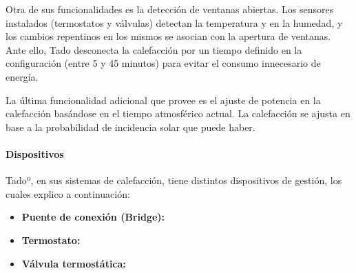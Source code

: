 \documentclass[spanish,12pt, a4paper, twoside]{paper}
\begin{document}
Otra de sus funcionalidades es la detección de ventanas abiertas. Los sensores instalados (termostatos y válvulas) detectan la temperatura y en la humedad, y los cambios repentinos en los mismos se asocian con la apertura de ventanas. Ante ello, Tado desconecta la calefacción por un tiempo definido en la configuración (entre 5 y 45 minutos) para evitar el consumo innecesario de energía.
\newline

La última funcionalidad adicional que provee es el ajuste de potencia en la calefacción basándose en el tiempo atmosférico actual. La calefacción se ajusta en base a la probabilidad de incidencia solar que puede haber.

\paragraph{Dispositivos}

Tadoº, en sus sistemas de calefacción, tiene distintos dispositivos de gestión, los cuales explico a continuación:

\begin{itemize}
\item\textbf{Puente de conexión (Bridge):}
\item\textbf{Termostato:}
\item\textbf{Válvula termostática:}
\end{itemize}
\end{document}
